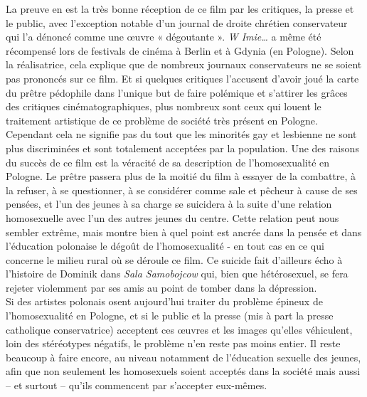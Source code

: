 \documentclass[12pt]{amsart}
\begin{document}
\begin{multicols}{2}
La preuve en est la très bonne réception de ce film par les critiques, la presse et le public, avec l’exception notable d’un journal de droite chrétien conservateur qui l’a dénoncé comme une œuvre « dégoutante ». \emph{W Imie…} a même été récompensé lors de festivals de cinéma à Berlin et à Gdynia (en Pologne). Selon la réalisatrice, cela explique que de nombreux journaux conservateurs ne se soient pas prononcés sur ce film. Et si quelques critiques l’accusent d’avoir joué la carte du prêtre pédophile dans l’unique but de faire polémique et s’attirer les grâces des critiques cinématographiques, plus nombreux sont ceux qui louent le traitement artistique de ce problème de société très présent en Pologne. Cependant cela ne signifie pas du tout que les minorités gay et lesbienne ne sont plus discriminées et sont totalement acceptées par la population. Une des raisons du succès de ce film est la véracité de sa description de l’homosexualité en Pologne. Le prêtre passera plus de la moitié du film à essayer de la combattre, à la refuser, à se questionner, à se considérer comme sale et pêcheur à cause de ses pensées, et l’un des jeunes à sa charge se suicidera à la suite d’une relation homosexuelle avec l’un des autres jeunes du centre. Cette relation peut nous sembler extrême, mais montre bien à quel point est ancrée dans la pensée et dans l’éducation polonaise le dégoût de l’homosexualité - en tout cas en ce qui concerne le milieu rural où se déroule ce film. Ce suicide fait d’ailleurs écho à l’histoire de Dominik dans \emph{Sala Samobojcow} qui, bien que hétérosexuel, se fera rejeter violemment par ses amis au point de tomber dans la dépression. \\
Si des artistes polonais osent aujourd’hui traiter du problème épineux de l’homosexualité en Pologne, et si le public et la presse (mis à part la presse catholique conservatrice) acceptent ces œuvres et les images qu’elles véhiculent, loin des stéréotypes négatifs, le problème n’en reste pas moins entier. Il reste beaucoup à faire encore, au niveau notamment de l’éducation sexuelle des jeunes, afin que non seulement les homosexuels soient acceptés dans la société mais aussi – et surtout – qu’ils commencent par s’accepter eux-mêmes.
\clearpage

\end{multicols}
\end{document}
